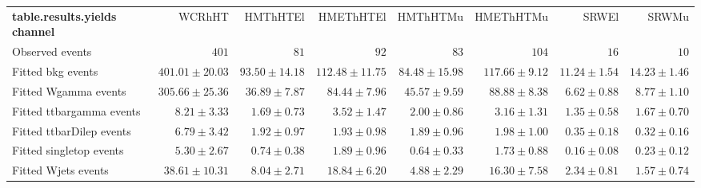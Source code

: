 

\begin{table}
\begin{center}
\setlength{\tabcolsep}{0.0pc}
{\small
\begin{tabular*}{\textwidth}{@{\extracolsep{\fill}}lrrrrrrr}
\noalign{\smallskip}\hline\noalign{\smallskip}
{\bf table.results.yields channel}           & WCRhHT            & HMThHTEl            & HMEThHTEl            & HMThHTMu            & HMEThHTMu            & SRWEl            & SRWMu              \\[-0.05cm]
\noalign{\smallskip}\hline\noalign{\smallskip}
Observed events          & $401$              & $81$              & $92$              & $83$              & $104$              & $16$              & $10$                    \\
\noalign{\smallskip}\hline\noalign{\smallskip}
Fitted bkg events         & $401.01 \pm 20.03$          & $93.50 \pm 14.18$          & $112.48 \pm 11.75$          & $84.48 \pm 15.98$          & $117.66 \pm 9.12$          & $11.24 \pm 1.54$          & $14.23 \pm 1.46$              \\
\noalign{\smallskip}\hline\noalign{\smallskip}
        Fitted Wgamma events         & $305.66 \pm 25.36$          & $36.89 \pm 7.87$          & $84.44 \pm 7.96$          & $45.57 \pm 9.59$          & $88.88 \pm 8.38$          & $6.62 \pm 0.88$          & $8.77 \pm 1.10$              \\
        Fitted ttbargamma events         & $8.21 \pm 3.33$          & $1.69 \pm 0.73$          & $3.52 \pm 1.47$          & $2.00 \pm 0.86$          & $3.16 \pm 1.31$          & $1.35 \pm 0.58$          & $1.67 \pm 0.70$              \\
        Fitted ttbarDilep events         & $6.79 \pm 3.42$          & $1.92 \pm 0.97$          & $1.93 \pm 0.98$          & $1.89 \pm 0.96$          & $1.98 \pm 1.00$          & $0.35 \pm 0.18$          & $0.32 \pm 0.16$              \\
        Fitted singletop events         & $5.30 \pm 2.67$          & $0.74 \pm 0.38$          & $1.89 \pm 0.96$          & $0.64 \pm 0.33$          & $1.73 \pm 0.88$          & $0.16 \pm 0.08$          & $0.23 \pm 0.12$              \\
        Fitted Wjets events         & $38.61 \pm 10.31$          & $8.04 \pm 2.71$          & $18.84 \pm 6.20$          & $4.88 \pm 2.29$          & $16.30 \pm 7.58$          & $2.34 \pm 0.81$          & $1.57 \pm 0.74$              \\

\end{tabular*}}
\end{center}
\end{table}
